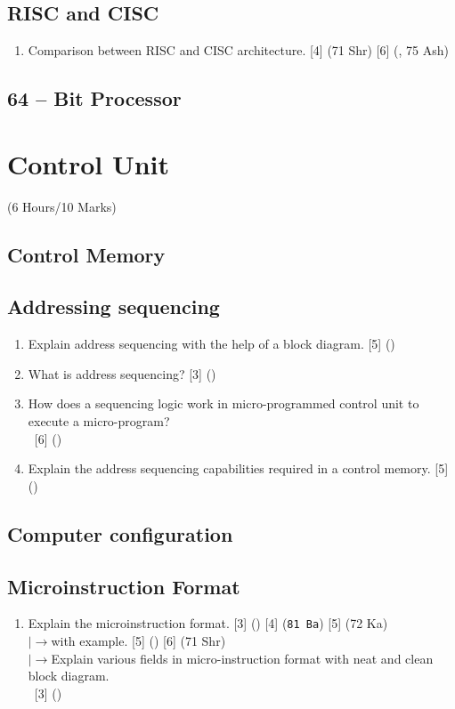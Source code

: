 \documentclass[12pt]{article}
\newcommand{\lb}{\\$\left|\rightarrow\right.$}
\newcommand{\enter}{\\\textcolor{white}{1}}
\begin{document}
	\subsection{RISC and CISC}
	\begin{enumerate}
		\item Comparison between RISC and CISC architecture. \hfill [4] (71 Shr) [6] (, 75 Ash)
	\end{enumerate}
	\subsection{64 – Bit Processor}

	\pagebreak
\section{Control Unit}
	\begin{center}(6 Hours/10 Marks)\end{center} 
	\subsection{Control Memory}
	
	\subsection{Addressing sequencing}
		\begin{enumerate}
			\item Explain address sequencing with the help of a block diagram. \hfill [5] ()
			
			\item What is address sequencing? \hfill [3] ()
			
			\item How does a sequencing logic work in micro-programmed control unit to execute a micro-program?
			\enter\hfill [6] ()
			\item Explain the address sequencing capabilities required in a control memory. \hfill [5] ()
		\end{enumerate}
	
	\subsection{Computer configuration}
	
	\subsection{Microinstruction Format}
		\begin{enumerate}[noitemsep, topsep=0pt]
			\item Explain the microinstruction format.  \hfill [3] () [4] (\texttt{81 Ba}) [5] (72 Ka)
			\lb with example. \hfill [5] () [6] (71 Shr)
			\lb Explain various fields in micro-instruction format with neat and clean block diagram.
			\enter\hfill [3] ()
		\end{enumerate}
		
\end{document}
